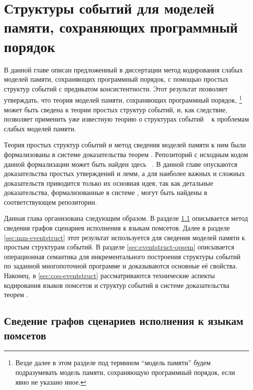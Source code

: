 \chapter{Структуры событий для моделей памяти, сохраняющих программный порядок}
\label{ch:porf-evenstruct}

В данной главе описан предложенный в диссертации метод 
кодирования слабых моделей памяти, сохраняющих программный порядок, 
с помощью простых структур событий с предикатом консистентности. 
Этот результат позволяет утверждать, что теория  
моделей памяти, сохраняющих программный порядок,%
\footnote{Везде далее в этом разделе 
под термином ``модель памяти'' будем подразумевать 
модель памяти, сохраняющую программный порядок, если явно не указано иное.}
может быть сведена к теории простых структур событий, 
и, как следствие, позволяет применить уже известную теорию о структурах событий%
~\cite{Winskel:86,Vaandrager:TCS1991,Sassone:MFCS1993,Nielsen:REX93,Winskel-TCS:09}
к проблемам слабых моделей памяти.

Теория простых структур событий и метод сведения 
моделей памяти к ним были формализованы в системе 
доказательства теорем \coq.
Репозиторий с исходным кодом данной формализации
может быть найден здесь~%
\cite{Coq:EventStruct}.
В данной главе опускаются доказательства
простых утверждений и лемм, а для наиболее
важных и сложных доказательств приводится только их основная идея,
так как детальные доказательства, формализованные в системе \coq,
могут быть найдены в соответствующем репозитории.


Данная глава организована следующим образом. 
В разделе \ref{sec:pomset-graphs} описывается метод 
сведения графов сценариев исполнения к языкам помсетов. 
Далее в разделе \ref{sec:mm-eventstruct} этот результат 
используется для сведения моделей памяти к простым структурам событий. 
В разделе \ref{sec:eventstruct-opsem} описывается 
операционная семантика для инкрементального построения 
структуры событий по заданной многопоточной программе 
и доказываются основные её свойства. 
Наконец, в \ref{sec:coq-eventstruct} рассматриваются 
технические аспекты кодирования языков помсетов и структур событий 
в системе доказательства теорем \coq.

\section{Сведение графов сценариев исполнения к языкам помсетов}
\label{sec:pomset-graphs}


